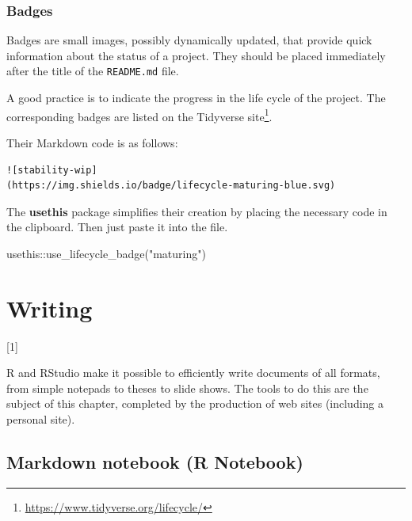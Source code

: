 \documentclass[
  12pt,
  american,
  a4paper,
  extrafontsizes,onecolumn,openright
  ]{memoir}
\newenvironment{Shaded}{\begin{snugshade}}{\end{snugshade}}
\newcommand{\FunctionTok}[1]{\textcolor[rgb]{0.00,0.00,0.00}{#1}}
\newcommand{\NormalTok}[1]{#1}
\newcommand{\SpecialCharTok}[1]{\textcolor[rgb]{0.00,0.00,0.00}{#1}}
\newcommand{\StringTok}[1]{\textcolor[rgb]{0.31,0.60,0.02}{#1}}
\newcommand{\toc}[1]{%
  \startcontents[chapters]%
  \printcontents[chapters]{}{1}[#1]{}%
  ~\newline%
}
\begin{document}
\hypertarget{badges}{%
\subsection{Badges}\label{badges}}

Badges are small images, possibly dynamically updated, that provide quick information about the status of a project.
They should be placed immediately after the title of the \texttt{README.md} file.

A good practice is to indicate the progress in the life cycle of the project.
The corresponding badges are listed on the Tidyverse site\footnote{\url{https://www.tidyverse.org/lifecycle/}}.

Their Markdown code is as follows:

\begin{verbatim}
![stability-wip]
(https://img.shields.io/badge/lifecycle-maturing-blue.svg)
\end{verbatim}

The \textbf{usethis} package simplifies their creation by placing the necessary code in the clipboard.
Then just paste it into the file.

\scriptsize

\begin{Shaded}
\begin{Highlighting}[]
\NormalTok{usethis}\SpecialCharTok{::}\FunctionTok{use\_lifecycle\_badge}\NormalTok{(}\StringTok{"maturing"}\NormalTok{)}
\end{Highlighting}
\end{Shaded}

\normalsize

\hypertarget{chap-rediger}{%
\chapter{Writing}\label{chap-rediger}}

\toc{1}

R and RStudio make it possible to efficiently write documents of all formats, from simple notepads to theses to slide shows.
The tools to do this are the subject of this chapter, completed by the production of web sites (including a personal site).

\hypertarget{markdown-notebook-r-notebook}{%
\section{Markdown notebook (R Notebook)}\label{markdown-notebook-r-notebook}}
\end{document}
